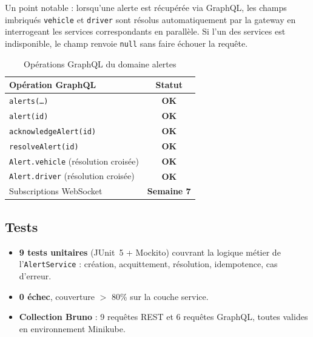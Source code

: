 \documentclass[12pt,a4paper]{article}
\begin{document}
Un point notable : lorsqu'une alerte est r\'{e}cup\'{e}r\'{e}e via GraphQL, les champs imbriqués \texttt{vehicle} et \texttt{driver} sont r\'{e}solus automatiquement par la gateway en interrogeant les services correspondants en parall\`{e}le. Si l'un des services est indisponible, le champ renvoie \texttt{null} sans faire \'{e}chouer la requ\^{e}te.

\begin{table}[H]
\centering
\small
\begin{tabular}{|l|c|}
  \hline
  \rowcolor{primary!15}
  \textbf{Op\'{e}ration GraphQL} & \textbf{Statut} \\
  \hline
  \texttt{alerts(\ldots)}            & \textcolor{success}{\textbf{OK}} \\
  \texttt{alert(id)}                 & \textcolor{success}{\textbf{OK}} \\
  \texttt{acknowledgeAlert(id)}      & \textcolor{success}{\textbf{OK}} \\
  \texttt{resolveAlert(id)}          & \textcolor{success}{\textbf{OK}} \\
  \texttt{Alert.vehicle} (r\'{e}solution crois\'{e}e) & \textcolor{success}{\textbf{OK}} \\
  \texttt{Alert.driver} (r\'{e}solution crois\'{e}e)  & \textcolor{success}{\textbf{OK}} \\
  Subscriptions WebSocket            & \textcolor{warning}{\textbf{Semaine 7}} \\
  \hline
\end{tabular}
\caption{Op\'{e}rations GraphQL du domaine alertes}
\end{table}

\subsection{Tests}

\begin{itemize}[leftmargin=*]
  \item \textbf{9 tests unitaires} (JUnit~5 + Mockito) couvrant la logique m\'{e}tier de l'\texttt{AlertService} : cr\'{e}ation, acquittement, r\'{e}solution, idempotence, cas d'erreur.
  \item \textbf{0 \'{e}chec}, couverture $>$ 80\% sur la couche service.
  \item \textbf{Collection Bruno} : 9 requ\^{e}tes REST et 6 requ\^{e}tes GraphQL, toutes valides en environnement Minikube.
\end{itemize}
\end{document}
